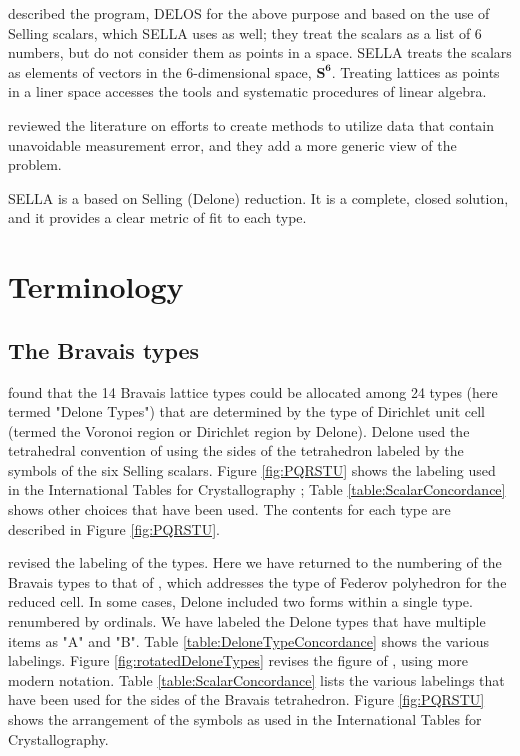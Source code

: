\documentclass[preprint]{iucr}              %
\newcommand{\SVI}[0]{$\mathbf{S^{6}}$}
\begin{document}
	 described the program, DELOS
	for the above purpose and based on the use of Selling scalars, which
	SELLA uses as well; they treat the scalars as a list of 6 numbers, but do not consider them as points in 
	a space.  SELLA treats the scalars as elements of vectors in the 6-dimensional
	space, \SVI. Treating lattices as points in a liner space accesses the tools
	and systematic procedures of linear algebra.
	
	
	 reviewed the literature on 
	 efforts to create methods to utilize data that contain unavoidable 
	measurement error, and they add a more generic view of the problem.
	
	SELLA is a based on Selling (Delone) reduction. It is a complete, closed solution, and it provides a clear metric of fit to each type.
	
	\section{Terminology}
	
	\subsection{The Bravais types}
	
	 found that the 14 Bravais lattice types 
	could be allocated among 24 types (here termed "Delone Types") that are determined by the 
	type of Dirichlet unit cell (termed the Voronoi region \cite{Voronoi1908} or 
	Dirichlet region \cite{dirichlet1850} by 
	Delone). Delone used the tetrahedral convention of 
	using the sides of the tetrahedron labeled by the symbols of the six
	Selling scalars. Figure \ref{fig:PQRSTU} shows the labeling used in
	the International Tables for Crystallography \cite{Henry1952}; 
	Table \ref{table:ScalarConcordance} shows other choices that have been used. The
	contents for each type are described in Figure \ref{fig:PQRSTU}.
	
	
	
	 revised the labeling of the types.
	Here we have returned to the numbering of the Bravais types to that 
	of , which addresses the type
	of Federov polyhedron for the reduced cell.
	In some cases, Delone included two forms within a single 
	type. 
	renumbered by ordinals. We have labeled the Delone 
	types that have multiple items as "A" and "B". Table \ref{table:DeloneTypeConcordance}
	shows the various labelings. Figure \ref{fig:rotatedDeloneTypes} 
	revises the figure of , using 
	more modern notation. Table \ref{table:ScalarConcordance} 
	lists the various labelings that have been 
	used for the sides of the Bravais tetrahedron. 
	Figure \ref{fig:PQRSTU} shows the arrangement of the 
	symbols as used in the International Tables for Crystallography.
	
\end{document}
